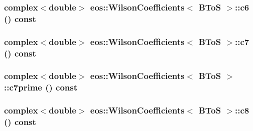 \label{structeos_1_1WilsonCoefficients_3_01BToS_01_4_ad68ee72fdb415820d0ff3f042a8d9e14}
\hypertarget{structeos_1_1WilsonCoefficients_3_01BToS_01_4_a552e58e087a6b5c4a0cec7d30486154e}{
\subsubsection[{c6}]{\setlength{\rightskip}{0pt plus 5cm}complex$<$double$>$ eos::WilsonCoefficients$<$ {\bf BToS} $>$::c6 () const}}
\label{structeos_1_1WilsonCoefficients_3_01BToS_01_4_a552e58e087a6b5c4a0cec7d30486154e}
\hypertarget{structeos_1_1WilsonCoefficients_3_01BToS_01_4_aabbbd9922af280cfef8cf7a243e1c02e}{
\subsubsection[{c7}]{\setlength{\rightskip}{0pt plus 5cm}complex$<$double$>$ eos::WilsonCoefficients$<$ {\bf BToS} $>$::c7 () const}}
\label{structeos_1_1WilsonCoefficients_3_01BToS_01_4_aabbbd9922af280cfef8cf7a243e1c02e}
\hypertarget{structeos_1_1WilsonCoefficients_3_01BToS_01_4_a40dafdcff20076a5cf44d529ac664f09}{
\subsubsection[{c7prime}]{\setlength{\rightskip}{0pt plus 5cm}complex$<$double$>$ eos::WilsonCoefficients$<$ {\bf BToS} $>$::c7prime () const}}
\label{structeos_1_1WilsonCoefficients_3_01BToS_01_4_a40dafdcff20076a5cf44d529ac664f09}
\hypertarget{structeos_1_1WilsonCoefficients_3_01BToS_01_4_ad1700818a303de24c0d9aba06b9428db}{
\subsubsection[{c8}]{\setlength{\rightskip}{0pt plus 5cm}complex$<$double$>$ eos::WilsonCoefficients$<$ {\bf BToS} $>$::c8 () const}}

